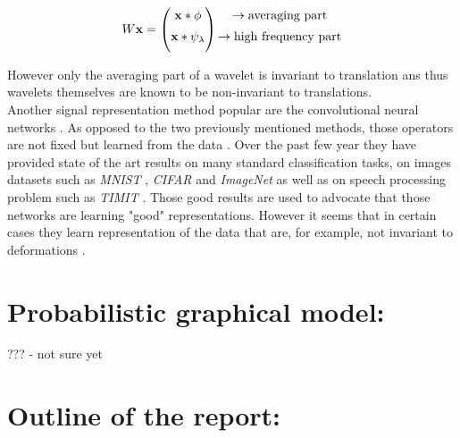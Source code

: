 \documentclass[a4paper,11pt]{report}
\begin{document}
			\begin{equation}
				\begin{matrix}
					W{\bf x} =
					\begin{pmatrix}
						{\bf x} \ast \phi \\[0.5em]
						{\bf x} \ast \psi_{\lambda} \\[0.5em]
					\end{pmatrix}
					\begin{aligned}
						\begin{matrix}
							\rightarrow \text{averaging part}				\\[0.5em]
							\rightarrow \text{high frequency part}	\\[0.5em]
						\end{matrix}
					\end{aligned}
				\end{matrix}
			\end{equation}
		

			However only the averaging part of a wavelet is invariant to translation ans thus wavelets themselves are known to be non-invariant to translations.\\
			
			Another signal representation method popular are the convolutional neural networks \cite{lecun1995convolutional}. As opposed to the two previously mentioned methods, those operators are not fixed but learned from the data \cite{simard2003best}. Over the past few year they have provided state of the art results on many standard classification tasks, on images datasets such as \textit{MNIST} , \textit{CIFAR} \cite{hinton2012improving} and \textit{ImageNet} \cite{krizhevsky2012imagenet} as well as on speech processing problem such as \textit{TIMIT} \cite{abdel2012applying}. Those good results are used to advocate that those networks are learning "good" representations. However it seems that in certain cases they learn representation of the data that are, for example, not invariant to deformations \cite{szegedy2013intriguing}.\\
			         
	\section{Probabilistic graphical model:}
		??? - not sure yet
		
	\section{Outline of the report:}
    \label{sec:Intro/Outline of the report}    
    
\end{document}
